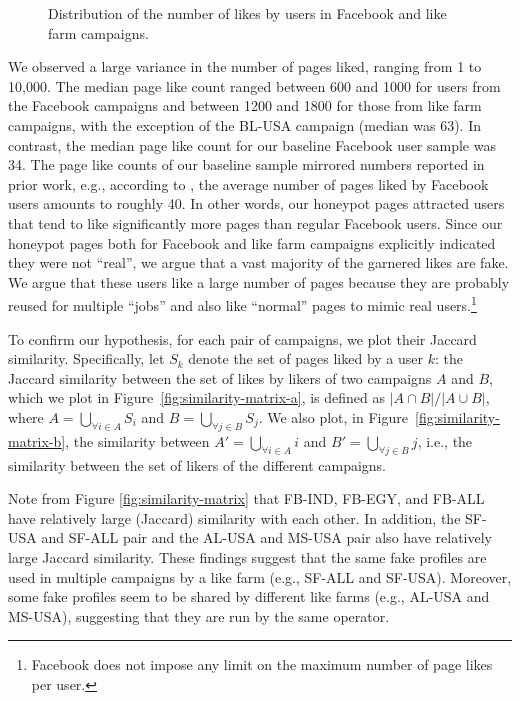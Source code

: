 \documentclass[twocolumn,10pt,letterpaper]{article}
\begin{document}
\begin{figure*}[t!]
\centering
\vspace{-0.15cm}
\caption{Distribution of the number of likes by users in Facebook and like farm campaigns.}%
\label{fig:like-distribution}
%
\end{figure*}


%
We observed a large variance in the number of pages liked, ranging from 1 to 10,000.
%
The median page like count ranged between 600 and 1000 for users from the Facebook campaigns and between 1200 and 1800 for those from like farm campaigns, with the exception of the BL-USA campaign (median was 63).
%
In contrast, the median page like count for our baseline Facebook user sample was 34.
%
The page like counts of our baseline sample mirrored numbers reported in prior work, e.g.,
%
according to \cite{allfacebook}, the average number of pages liked by Facebook users amounts to roughly 40.
%
In other words, our honeypot pages attracted users that tend to like significantly more pages than regular Facebook users.
%
Since our honeypot pages both for Facebook and like farm campaigns explicitly indicated they were not ``real'', we argue that a vast majority of the garnered likes are fake.
%
We argue that these users like a large number of pages because they are probably reused for multiple ``jobs'' and also like ``normal'' pages to mimic real users.\footnote{Facebook does not impose any limit on the maximum number of page likes per user.}

To confirm our hypothesis, for each pair of campaigns, we plot their Jaccard similarity.
%
Specifically, let $S_k$ denote the set of pages liked by a user $k$: the Jaccard similarity between the set of likes by likers of two campaigns $A$ and $B$, which we plot in Figure~\ref{fig:similarity-matrix-a}, is defined as $|A \cap B|/| A \cup B|$,
%
where $A = \bigcup_{\forall i \in A} S_i $ and $ B = \bigcup_{\forall j \in B} S_j $. %
%
We also plot, in Figure~\ref{fig:similarity-matrix-b}, the similarity between
$A' = \bigcup_{\forall i \in A} i $ and $ B' = \bigcup_{\forall j \in B} j $, i.e., the similarity between the set of likers of the different campaigns.
%
%

Note from Figure \ref{fig:similarity-matrix} that FB-IND, FB-EGY, and FB-ALL have relatively large (Jaccard) similarity with each other.
%
In addition, the SF-USA and SF-ALL pair and the AL-USA and MS-USA pair also have relatively large Jaccard similarity.
%
These findings suggest that the same fake profiles are used in multiple campaigns by a like farm (e.g., SF-ALL and SF-USA). Moreover, some fake profiles seem to be shared by different like farms (e.g., AL-USA and MS-USA), suggesting that they are run by the same operator.
\end{document}
